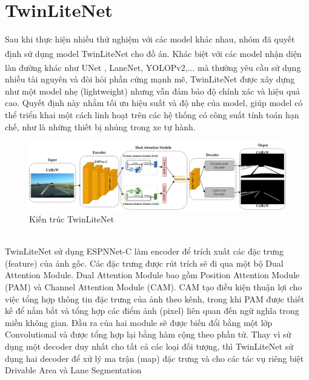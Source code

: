 \section{TwinLiteNet}
\tab Sau khi thực hiện nhiều thử nghiệm với các model khác nhau, nhóm đã quyết định sử dụng model TwinLiteNet\textsuperscript{\cite{twinlitenet}} cho đồ án. Khác biệt với các model nhận diện làn đường khác như UNet \textsuperscript{\cite{unet}}, LaneNet\textsuperscript{\cite{lanenet}}, YOLOPv2\textsuperscript{\cite{yolopv2}},... mà thường yêu cầu sử dụng nhiều tài nguyên và đòi hỏi phần cứng mạnh mẽ, TwinLiteNet được xây dựng như một model nhẹ (lightweight) nhưng vẫn đảm bảo độ chính xác và hiệu quả cao. Quyết định này nhằm tối ưu hiệu suất và độ nhẹ của model, giúp model có thể triển khai một cách linh hoạt trên các hệ thống có công suất tính toán hạn chế, như là những thiết bị nhúng trong xe tự hành.\\
\begin{figure}[h]
\begin{center}
    \includegraphics[width=16.5cm]{img/2_Theory/TwinLiteNet_arch.png}
    \caption{Kiến trúc TwinLiteNet}
\end{center}
\end{figure}\\
\tab TwinLiteNet sử dụng ESPNNet-C làm encoder để trích xuất các đặc trưng (feature) của ảnh gốc. Các đặc trưng được rút trích sẽ đi qua một bộ Dual Attention Module. Dual Attention Module bao gồm Position Attention Module (PAM) và Channel Attention Module (CAM). CAM tạo điều kiện thuận lợi cho việc tổng hợp thông tin đặc trưng của ảnh theo kênh, trong khi PAM được thiết kế để nắm bắt và tổng hợp các điểm ảnh (pixel) liên quan đến ngữ nghĩa trong miền không gian. Đầu ra của hai module sẽ được biến đổi bằng một lớp Convolutional và được tổng hợp lại bằng hàm cộng theo phần tử. Thay vì sử dụng một decoder duy nhất cho tất cả các loại đối tượng, thì TwinLiteNet sử dụng hai decoder để xử lý ma trận (map) đặc trưng và cho các tác vụ riêng biệt Drivable Area và Lane Segmentation
